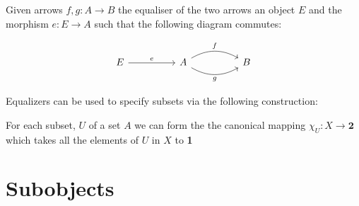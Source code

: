 \documentclass[a4paper,12pt]{article}
\begin{document}
Given arrows $f, g : A \rightarrow B $ the equaliser of the two arrows an object
$E$ and the morphism $e: E \rightarrow A$ such that the following diagram
commutes:

\[\begin{tikzcd}[sep=huge]
    E \arrow[r, "e"] & A \arrow[r, "f", bend left] \arrow[r, "g"', bend right] &
    B
\end{tikzcd}\]


Equalizers can be used to specify subsets via the following construction:

For each subset, $U$ of a set $A$ we can form the the canonical mapping
$\chi_{U}: X \rightarrow \textbf{2}$ which takes all the elements of $U$ in
$X$ to \textbf{1}
\section{Subobjects}
\end{document}
